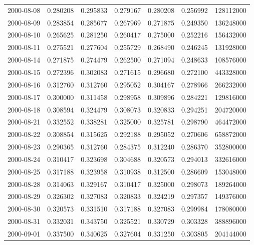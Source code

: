 \begin{tabular}{lrrrrrr}
2000-08-08 &    0.280208 &    0.295833 &    0.279167 &    0.280208 &    0.256992 &   128112000 \\
2000-08-09 &    0.283854 &    0.285677 &    0.267969 &    0.271875 &    0.249350 &   136248000 \\
2000-08-10 &    0.265625 &    0.281250 &    0.260417 &    0.275000 &    0.252216 &   156432000 \\
2000-08-11 &    0.275521 &    0.277604 &    0.255729 &    0.268490 &    0.246245 &   131928000 \\
2000-08-14 &    0.271875 &    0.274479 &    0.262500 &    0.271094 &    0.248633 &   108576000 \\
2000-08-15 &    0.272396 &    0.302083 &    0.271615 &    0.296680 &    0.272100 &   443328000 \\
2000-08-16 &    0.312760 &    0.312760 &    0.295052 &    0.304167 &    0.278966 &   266232000 \\
2000-08-17 &    0.300000 &    0.311458 &    0.298958 &    0.309896 &    0.284221 &   129816000 \\
2000-08-18 &    0.308594 &    0.324479 &    0.308073 &    0.320833 &    0.294251 &   204720000 \\
2000-08-21 &    0.332552 &    0.338281 &    0.325000 &    0.325781 &    0.298790 &   464472000 \\
2000-08-22 &    0.308854 &    0.315625 &    0.292188 &    0.295052 &    0.270606 &   658872000 \\
2000-08-23 &    0.290365 &    0.312760 &    0.284375 &    0.312240 &    0.286370 &   352800000 \\
2000-08-24 &    0.310417 &    0.323698 &    0.304688 &    0.320573 &    0.294013 &   332616000 \\
2000-08-25 &    0.317188 &    0.323958 &    0.310938 &    0.312500 &    0.286609 &   153048000 \\
2000-08-28 &    0.314063 &    0.329167 &    0.310417 &    0.325000 &    0.298073 &   189264000 \\
2000-08-29 &    0.326302 &    0.327083 &    0.320833 &    0.324219 &    0.297357 &   149376000 \\
2000-08-30 &    0.320573 &    0.331510 &    0.317188 &    0.327083 &    0.299984 &   178080000 \\
2000-08-31 &    0.332031 &    0.343750 &    0.325521 &    0.330729 &    0.303328 &   388896000 \\
2000-09-01 &    0.337500 &    0.340625 &    0.327604 &    0.331250 &    0.303805 &   204144000 \\

\end{tabular}
